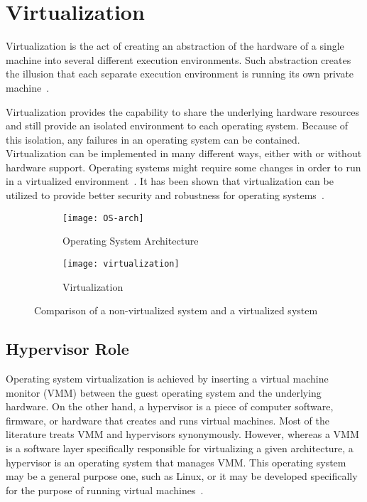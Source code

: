 \section{Virtualization}

Virtualization is the act of creating an abstraction of the hardware
of a single machine into several different execution environments. Such
abstraction creates the illusion that each separate execution environment
is running its own private machine~\cite{Galvin}.

Virtualization provides the capability to share the underlying hardware
resources and still provide an isolated environment to each operating
system. Because of this isolation, any failures in an operating
system can be contained. Virtualization can be implemented in many
different ways, either with or without hardware support. Operating
systems might require some changes in order to run in a virtualized
environment~\cite{Drepper:2008:CV:1348583.1348591}. It has been
shown that virtualization can be utilized to provide better security
and robustness for operating systems~\cite{Fraser04safehardware,
LeVasseur04UnmodifiedDriverReuse, Riley:2008:GPK:1433006.1433008}.

\begin{figure}[!ht]
    \centering
    \begin{subfigure}[b]{0.49\textwidth}
	\texttt{[image: OS-arch]}
	\caption{Operating System Architecture}
	\label{fig:OS}
    \end{subfigure}
	\hfill
    \begin{subfigure}[b]{0.49\textwidth}
	\texttt{[image: virtualization]}
	\caption{Virtualization}
	\label{fig:Virtualization}
	\end{subfigure}
    \caption{Comparison of a non-virtualized system and a virtualized system}\label{fig:virtualized-vs-nonvirtualized}
\end{figure}

\subsection{Hypervisor Role}
Operating system virtualization is achieved by inserting a virtual machine 
monitor (VMM) between the guest operating system and the underlying hardware. 
On the other hand, a hypervisor is a piece of computer software, firmware, or hardware
that creates and runs virtual machines.  Most of the literature treats VMM and
hypervisors synonymously. However, whereas a VMM is a software layer
specifically responsible for virtualizing a given architecture, a
hypervisor is an operating system that manages VMM. This operating
system may be a general purpose one, such as Linux, or it may
be developed specifically for the purpose of running virtual
machines~\cite{Agesen:2010:EXV:1899928.1899930}.

